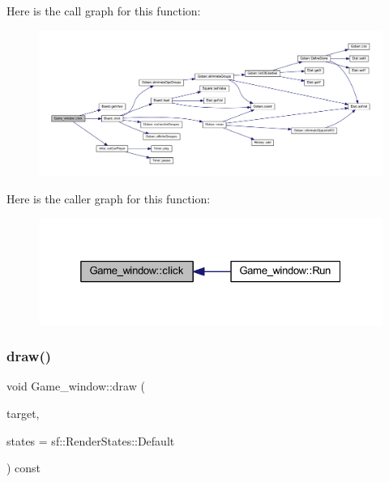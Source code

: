 Here is the call graph for this function\+:\nopagebreak
\begin{figure}[H]
\begin{center}
\leavevmode
\includegraphics[width=350pt]{class_game__window_afa942088809bf10731bb31d0d37b878d_cgraph}
\end{center}
\end{figure}
Here is the caller graph for this function\+:\nopagebreak
\begin{figure}[H]
\begin{center}
\leavevmode
\includegraphics[width=325pt]{class_game__window_afa942088809bf10731bb31d0d37b878d_icgraph}
\end{center}
\end{figure}
\mbox{\label{class_game__window_aafdea9d00265261abfac6ad233b54638}} 
\subsubsection{\texorpdfstring{draw()}{draw()}}
{\footnotesize\ttfamily void Game\+\_\+window\+::draw (\begin{DoxyParamCaption}\item[{sf\+::\+Render\+Target \&}]{target,  }\item[{sf\+::\+Render\+States}]{states = {\ttfamily sf\+:\+:RenderStates\+:\+:Default} }\end{DoxyParamCaption}) const\hspace{0.3cm}{\ttfamily [virtual]}}



